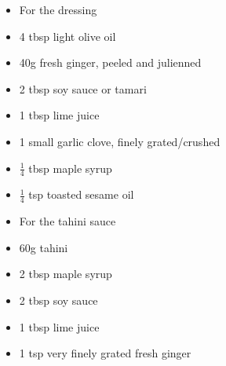 \documentclass{book}
\begin{document}
\begin{itemize}
\item For the dressing
\item 4 tbsp light olive oil
\item 40g fresh ginger, peeled and julienned
\item 2 tbsp soy sauce or tamari 
\item 1 tbsp lime juice
\item 1 small garlic clove, finely grated/crushed
\item $\frac{1}{4}$ tbsp maple syrup
\item $\frac{1}{4}$ tsp toasted sesame oil
\end{itemize}

\begin{itemize}
\item For the tahini sauce
\item 60g tahini 
\item 2 tbsp maple syrup
\item 2 tbsp soy sauce
\item 1 tbsp lime juice
\item 1 tsp very finely grated fresh ginger
\end{itemize}
\end{document}
